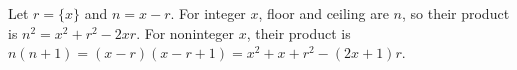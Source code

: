 Let $r=\{x\}$ and $n=x-r$. For integer $x$, floor and ceiling are $n$, so their product is $n^2=\boxed{x^2+r^2-2xr}$. For noninteger $x$, their product is $n(n+1)=(x-r)(x-r+1)=\boxed{x^2+x+r^2-(2x+1)r}$.
